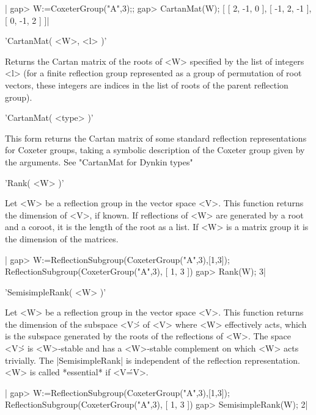 |    gap> W:=CoxeterGroup("A",3);;
    gap> CartanMat(W);
    [ [ 2, -1, 0 ], [ -1, 2, -1 ], [ 0, -1, 2 ] ]|

'CartanMat( <W>, <l> )'

Returns  the Cartan  matrix of  the roots  of <W>  specified by the list of
integers  <l>  (for  a  finite  reflection  group represented as a group of
permutation  of root  vectors, these  integers are  indices in  the list of
roots of the parent reflection group).

'CartanMat( <type> )'

This   form  returns  the   Cartan  matrix  of   some  standard  reflection
representations  for Coxeter groups,  taking a symbolic  description of the
Coxeter group given by the arguments. See "CartanMat for Dynkin types"


'Rank( <W> )'

Let  <W>  be  a  reflection  group  in  the vector space <V>. This function
returns the dimension of <V>, if known. If reflections of <W> are generated
by a root and a coroot, it is the length of the root as a list. If <W> is a
matrix group it is the dimension of the matrices.

|    gap> W:=ReflectionSubgroup(CoxeterGroup("A",3),[1,3]);
    ReflectionSubgroup(CoxeterGroup("A",3), [ 1, 3 ])
    gap> Rank(W);
    3|


'SemisimpleRank( <W> )'

Let  <W>  be  a  reflection  group  in  the vector space <V>. This function
returns  the dimension of  the subspace <V\'>  of <V> where <W> effectively
acts,  which is the subspace  generated by the roots  of the reflections of
<W>. The space <V\'> is <W>-stable and has a <W>-stable complement on which
<W>  acts trivially. The |SemisimpleRank|  is independent of the reflection
representation. <W> is called *essential* if <V\'=V>.

|    gap> W:=ReflectionSubgroup(CoxeterGroup("A",3),[1,3]);
    ReflectionSubgroup(CoxeterGroup("A",3), [ 1, 3 ])
    gap> SemisimpleRank(W);
    2|

